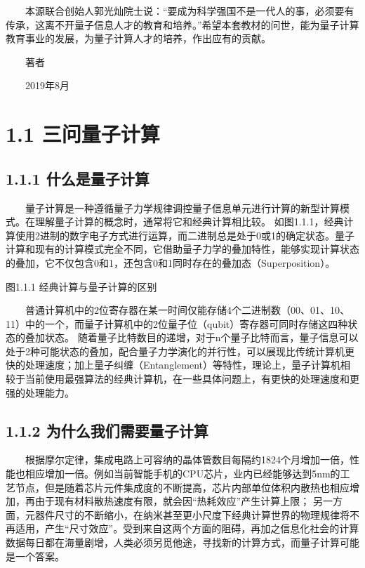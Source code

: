 \documentclass[a4paper,11pt,english]{sphinxmanual}
\begin{document}
\sphinxAtStartPar
  本源联合创始人郭光灿院士说：“要成为科学强国不是一代人的事，必须要有传承，这离不开量子信息人才的教育和培养。”希望本套教材的问世，能为量子计算教育事业的发展，为量子计算人才的培养，作出应有的贡献。

\sphinxAtStartPar
  著者

\sphinxAtStartPar
  2019年8月

\sphinxstepscope


\section{1.1 三问量子计算}
\label{\detokenize{rst/1.1_u4e09_u95ee_u91cf_u5b50_u8ba1_u7b97:id1}}\label{\detokenize{rst/1.1_u4e09_u95ee_u91cf_u5b50_u8ba1_u7b97::doc}}

\subsection{1.1.1 什么是量子计算}
\label{\detokenize{rst/1.1_u4e09_u95ee_u91cf_u5b50_u8ba1_u7b97:id2}}
\sphinxAtStartPar
  量子计算是一种遵循量子力学规律调控量子信息单元进行计算的新型计算模式。在理解量子计算的概念时，通常将它和经典计算相比较。
如图1.1.1，经典计算使用2进制的数字电子方式进行运算，而二进制总是处于0或1的确定状态。量子计算和现有的计算模式完全不同，它借助量子力学的叠加特性，能够实现计算状态的叠加，它不仅包含0和1，还包含0和1同时存在的叠加态（Superposition）。


\begin{center}图1.1.1 经典计算与量子计算的区别
\end{center}
\sphinxAtStartPar
  普通计算机中的2位寄存器在某一时间仅能存储4个二进制数（00、01、10、11）中的一个，而量子计算机中的2位量子位（qubit）寄存器可同时存储这四种状态的叠加状态。
随着量子比特数目的递增，对于n个量子比特而言，量子信息可以处于2种可能状态的叠加，配合量子力学演化的并行性，可以展现比传统计算机更快的处理速度；加上量子纠缠（Entanglement）等特性，理论上，量子计算机相较于当前使用最强算法的经典计算机，在一些具体问题上，有更快的处理速度和更强的处理能力。


\subsection{1.1.2 为什么我们需要量子计算}
\label{\detokenize{rst/1.1_u4e09_u95ee_u91cf_u5b50_u8ba1_u7b97:id3}}
\sphinxAtStartPar
  根据摩尔定律，集成电路上可容纳的晶体管数目每隔约18\sphinxhyphen{}24个月增加一倍，性能也相应增加一倍。例如当前智能手机的CPU芯片，业内已经能够达到5nm的工艺节点，但是随着芯片元件集成度的不断提高，芯片内部单位体积内散热也相应增加，再由于现有材料散热速度有限，就会因“热耗效应”产生计算上限；
另一方面，元器件尺寸的不断缩小，在纳米甚至更小尺度下经典计算世界的物理规律将不再适用，产生“尺寸效应”。受到来自这两个方面的阻碍，再加之信息化社会的计算数据每日都在海量剧增，人类必须另觅他途，寻找新的计算方式，而量子计算可能是一个答案。
\end{document}
